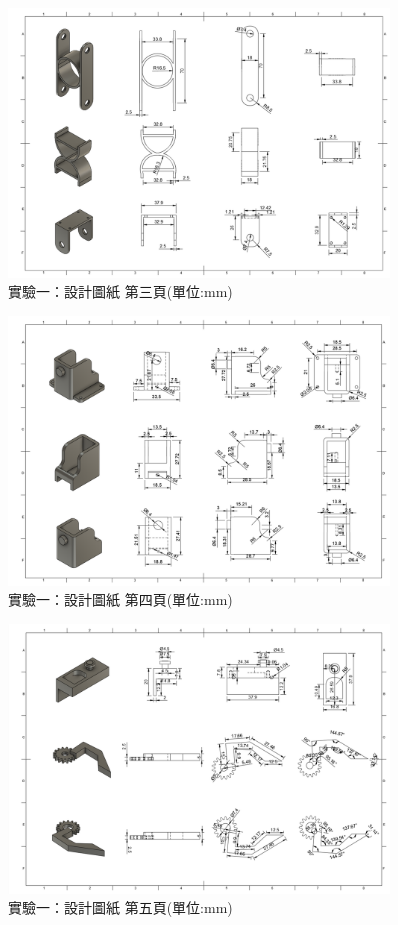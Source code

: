 \documentclass[class=NCU_thesis, crop=false]{standalone}
\begin{document}
\begin{figure}[htbp]
    \centering
    \includegraphics[width=0.9\textwidth]{figures/Armv1 (3).PNG}
    \caption{實驗一：設計圖紙 第三頁(單位:mm)}
\end{figure}

\begin{figure}[htbp]
    \centering
    \includegraphics[width=0.9\textwidth]{figures/Armv1 (4).PNG}
    \caption{實驗一：設計圖紙 第四頁(單位:mm)}
\end{figure}

\begin{figure}[htbp]
    \centering
    \includegraphics[width=0.9\textwidth]{figures/Armv1 (5).PNG}
    \caption{實驗一：設計圖紙 第五頁(單位:mm)}
\end{figure}
\end{document}
